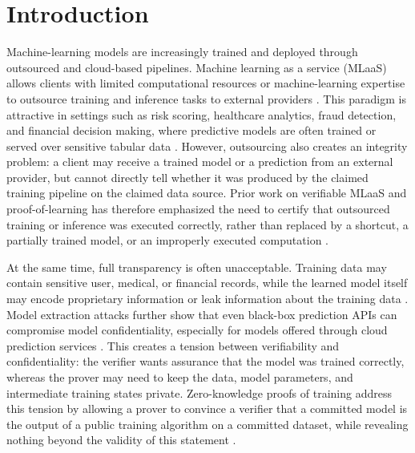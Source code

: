 \section{Introduction}

Machine-learning models are increasingly trained and deployed through
outsourced and cloud-based pipelines. Machine learning as a service
(MLaaS) allows clients with limited computational resources or machine-learning
expertise to outsource training and inference tasks to external providers
\cite{MLaaS15, machine_learning_survey20, VeriML21, privacy-mlaas23}. This paradigm is attractive in
settings such as risk scoring, healthcare analytics, fraud detection, and
financial decision making, where predictive models are often trained or served
over sensitive tabular data \cite{xgboost16,grinsztajn2022tree,shwartz2022tabular}.
However, outsourcing also creates an integrity problem: a client may receive a
trained model or a prediction from an external provider, but
cannot directly tell whether it was produced by the claimed training pipeline on
the claimed data source. Prior work on verifiable MLaaS and proof-of-learning
has therefore emphasized the need to certify that outsourced training or
inference was executed correctly, rather than replaced by a shortcut, a
partially trained model, or an improperly executed computation
\cite{VeriML21,proof_of_learning21,zkdnn24}.

At the same time, full transparency is often unacceptable. Training data may
contain sensitive user, medical, or financial records, while the learned model
itself may encode proprietary information or leak information about the
training data \cite{privacy-mlaas23,tramer2016stealing}. Model extraction
attacks further show that even black-box prediction APIs can compromise model
confidentiality, especially for models offered through cloud prediction
services \cite{tramer2016stealing}. This creates a tension between
verifiability and confidentiality: the verifier wants assurance that the model
was trained correctly, whereas the prover may need to keep the data, model
parameters, and intermediate training states private. Zero-knowledge proofs of
training address this tension by allowing a prover to convince a verifier that a
committed model is the output of a public training algorithm on a committed
dataset, while revealing nothing beyond the validity of this statement
\cite{zkdnn24,zkml_survey}.

